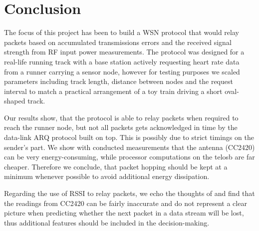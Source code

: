 \section{Conclusion}\label{ch:conclusion}

The focus of this project has been to build a WSN protocol that would relay packets based on accumulated transmissions errors and the received signal strength from RF input power measurements. The protocol was designed for a real-life running track with a base station actively requesting heart rate data from a runner carrying a sensor node, however for testing purposes we scaled parameters including track length, distance between nodes and the request interval to match a practical arrangement of a toy train driving a short oval-shaped track. 

\noindent Our results show, that the protocol is able to relay packets when required to reach the runner node, but not all packets gets acknowledged in time by the data-link ARQ protocol built on top. This is possibly due to strict timings on the sender's part. We show with conducted measurements that the antenna (CC2420) can be very energy-consuming, while processor computations on the telosb are far cheaper. Therefore we conclude, that packet hopping should be kept at a minimum whenever possible to avoid additional energy dissipation.

\noindent Regarding the use of RSSI to relay packets, we echo the thoughts of \cite{Heurtefeux2012} and find that the readings from CC2420 can be fairly inaccurate and do not represent a clear picture when predicting whether the next packet in a data stream will be lost, thus additional features should be included in the decision-making.